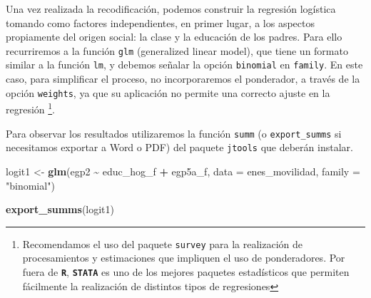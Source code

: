 \documentclass[
]{article}
\newenvironment{Shaded}{\begin{snugshade}}{\end{snugshade}}
\newcommand{\AttributeTok}[1]{\textcolor[rgb]{0.13,0.29,0.53}{#1}}
\newcommand{\FunctionTok}[1]{\textcolor[rgb]{0.13,0.29,0.53}{\textbf{#1}}}
\newcommand{\NormalTok}[1]{#1}
\newcommand{\OtherTok}[1]{\textcolor[rgb]{0.56,0.35,0.01}{#1}}
\newcommand{\SpecialCharTok}[1]{\textcolor[rgb]{0.81,0.36,0.00}{\textbf{#1}}}
\newcommand{\StringTok}[1]{\textcolor[rgb]{0.31,0.60,0.02}{#1}}
\begin{document}
Una vez realizada la recodificación, podemos construir la regresión logística tomando como factores independientes, en primer lugar, a los aspectos propiamente del origen social: la clase y la educación de los padres. Para ello recurriremos a la función \texttt{glm} (generalized linear model), que tiene un formato similar a la función \texttt{lm}, y debemos señalar la opción \texttt{binomial} en \texttt{family}. En este caso, para simplificar el proceso, no incorporaremos el ponderador, a través de la opción \texttt{weights}, ya que su aplicación no permite una correcto ajuste en la regresión \footnote{Recomendamos el uso del paquete \texttt{survey} para la realización de procesamientos y estimaciones que impliquen el uso de ponderadores. Por fuera de \textbf{\texttt{R}}, \textbf{\texttt{STATA}} es uno de los mejores paquetes estadísticos que permiten fácilmente la realización de distintos tipos de regresiones}.

Para observar los resultados utilizaremos la función \texttt{summ} (o \texttt{export\_summs} si necesitamos exportar a Word o PDF) del paquete \texttt{jtools} que deberán instalar.

\begin{Shaded}
\begin{Highlighting}[]
\NormalTok{logit1 }\OtherTok{\textless{}{-}} \FunctionTok{glm}\NormalTok{(egp2 }\SpecialCharTok{\textasciitilde{}}\NormalTok{ educ\_hog\_f }\SpecialCharTok{+}\NormalTok{ egp5a\_f, }\AttributeTok{data =}\NormalTok{ enes\_movilidad, }\AttributeTok{family =} \StringTok{"binomial"}\NormalTok{)}

\FunctionTok{export\_summs}\NormalTok{(logit1)}
\end{Highlighting}
\end{Shaded}

 
  \providecommand{\huxb}[2]{\arrayrulecolor[RGB]{#1}\global\arrayrulewidth=#2pt}
  \providecommand{\huxvb}[2]{\color[RGB]{#1}\vrule width #2pt}
  \providecommand{\huxtpad}[1]{\rule{0pt}{#1}}
  \providecommand{\huxbpad}[1]{\rule[-#1]{0pt}{#1}}
\end{document}
